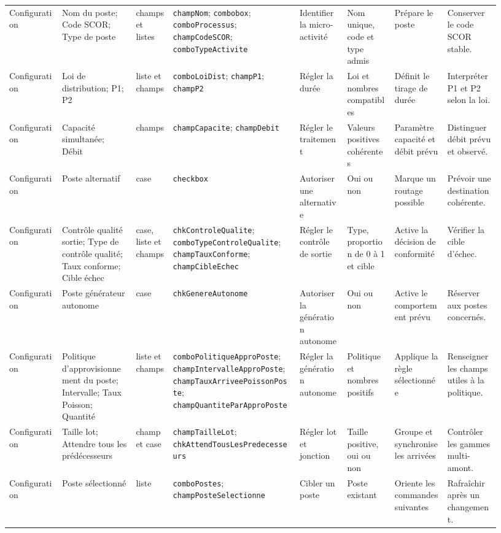 \begin{landscape}
{\begin{longtable}{L{0.10\linewidth} L{0.14\linewidth} L{0.07\linewidth} L{0.24\linewidth} L{0.09\linewidth} L{0.09\linewidth} L{0.10\linewidth} L{0.10\linewidth}}
Configuration & Nom du poste; Code SCOR; Type de poste & champs et listes & \texttt{champNom}; \texttt{combobox}; \texttt{comboProcessus}; \texttt{champCodeSCOR}; \texttt{comboTypeActivite} & Identifier la micro-activité & Nom unique, code et type admis & Prépare le poste & Conserver le code SCOR stable. \\
Configuration & Loi de distribution; P1; P2 & liste et champs & \texttt{comboLoiDist}; \texttt{champP1}; \texttt{champP2} & Régler la durée & Loi et nombres compatibles & Définit le tirage de durée & Interpréter P1 et P2 selon la loi. \\
Configuration & Capacité simultanée; Débit & champs & \texttt{champCapacite}; \texttt{champDebit} & Régler le traitement & Valeurs positives cohérentes & Paramètre capacité et débit prévu & Distinguer débit prévu et observé. \\
Configuration & Poste alternatif & case & \texttt{checkbox} & Autoriser une alternative & Oui ou non & Marque un routage possible & Prévoir une destination cohérente. \\
Configuration & Contrôle qualité sortie; Type de contrôle qualité; Taux conforme; Cible échec & case, liste et champs & \texttt{chkControleQualite}; \texttt{comboTypeControleQualite}; \texttt{champTauxConforme}; \texttt{champCibleEchec} & Régler le contrôle de sortie & Type, proportion de 0 à 1 et cible & Active la décision de conformité & Vérifier la cible d'échec. \\
Configuration & Poste générateur autonome & case & \texttt{chkGenereAutonome} & Autoriser la génération autonome & Oui ou non & Active le comportement prévu & Réserver aux postes concernés. \\
Configuration & Politique d'approvisionnement du poste; Intervalle; Taux Poisson; Quantité & liste et champs & \texttt{comboPolitiqueApproPoste}; \texttt{champIntervalleApproPoste}; \texttt{champTauxArriveePoissonPoste}; \texttt{champQuantiteParApproPoste} & Régler la génération autonome & Politique et nombres positifs & Applique la règle sélectionnée & Renseigner les champs utiles à la politique. \\
Configuration & Taille lot; Attendre tous les prédécesseurs & champ et case & \texttt{champTailleLot}; \texttt{chkAttendTousLesPredecesseurs} & Régler lot et jonction & Taille positive, oui ou non & Groupe et synchronise les arrivées & Contrôler les gammes multi-amont. \\
Configuration & Poste sélectionné & liste & \texttt{comboPostes}; \texttt{champPosteSelectionne} & Cibler un poste & Poste existant & Oriente les commandes suivantes & Rafraîchir après un changement. \\

\end{longtable}}
\end{landscape}

